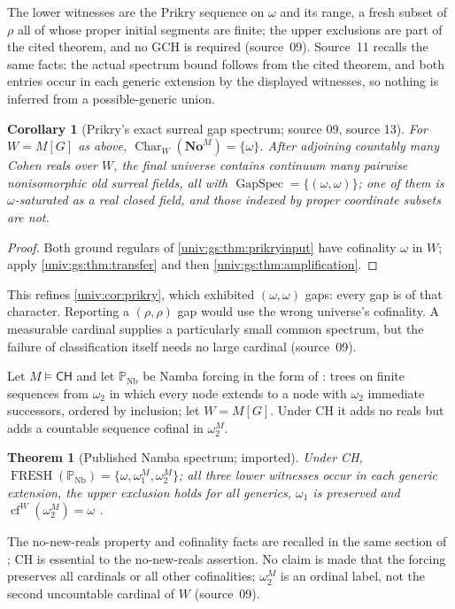 \documentclass[11pt,letterpaper]{article}
\numberwithin{equation}{section}
\newtheorem{theorem}{Theorem}[section]
\newtheorem{corollary}[corollary]{Corollary}
\theoremstyle{definition}
\theoremstyle{remark}
\newcommand{\No}{\mathbf{No}}
\newcommand{\NoM}{\No^{M}}
\newcommand{\cf}{\operatorname{cf}}
\newcommand{\GapSpec}{\operatorname{GapSpec}}
\newcommand{\Char}{\operatorname{Char}}
\newcommand{\FRESH}{\operatorname{FRESH}}
\newcommand{\CH}{\mathsf{CH}}
\begin{document}
The lower witnesses are the Prikry sequence on $\omega$ and its range, a fresh subset of $\rho$
all of whose proper initial segments are finite; the upper exclusions are part of the cited
theorem, and no GCH is required (source~09). Source~11 recalls the same facts: the actual
spectrum bound follows from the cited theorem, and both entries occur in each generic extension
by the displayed witnesses, so nothing is inferred from a possible-generic union.

\begin{corollary}[Prikry's exact surreal gap spectrum; source 09, source 13]\label{univ:gs:cor:prikry}
For $W=M[G]$ as above, $\Char_W(\NoM)=\{\omega\}$. After adjoining countably many Cohen reals
over $W$, the final universe contains continuum many pairwise nonisomorphic old surreal fields,
all with $\GapSpec=\{(\omega,\omega)\}$; one of them is $\omega$-saturated as a real closed
field, and those indexed by proper coordinate subsets are not.
\end{corollary}
\begin{proof}
Both ground regulars of \cref{univ:gs:thm:prikryinput} have cofinality $\omega$ in $W$; apply
\cref{univ:gs:thm:transfer} and then \cref{univ:gs:thm:amplification}.
\end{proof}

This refines \cref{univ:cor:prikry}, which exhibited $(\omega,\omega)$ gaps: every gap is of that
character. Reporting a $(\rho,\rho)$ gap would use the wrong universe's cofinality. A measurable
cardinal supplies a particularly small common spectrum, but the failure of classification itself
needs no large cardinal (source~09).

Let $M\models\CH$ and let $\mathbb P_{\mathrm{Nb}}$ be Namba forcing in the form of
\cite[Section~7.6]{FKW}: trees on finite sequences from $\omega_2$ in which every node extends to
a node with $\omega_2$ immediate successors, ordered by inclusion; let $W=M[G]$. Under CH it adds
no reals but adds a countable sequence cofinal in $\omega_2^M$.

\begin{theorem}[Published Namba spectrum; imported]\label{univ:gs:thm:nambainput}
Under CH, $\FRESH(\mathbb P_{\mathrm{Nb}})=\{\omega,\omega_1^M,\omega_2^M\}$; all three lower
witnesses occur in each generic extension, the upper exclusion holds for all generics, $\omega_1$
is preserved and $\cf^W(\omega_2^M)=\omega$ \cite[Theorem~7.23(1)]{FKW}.
\end{theorem}

The no-new-reals property and cofinality facts are recalled in the same section of \cite{FKW};
CH is essential to the no-new-reals assertion. No claim is made that the forcing preserves all
cardinals or all other cofinalities; $\omega_2^M$ is an ordinal label, not the second uncountable
cardinal of $W$ (source~09).
\end{document}
